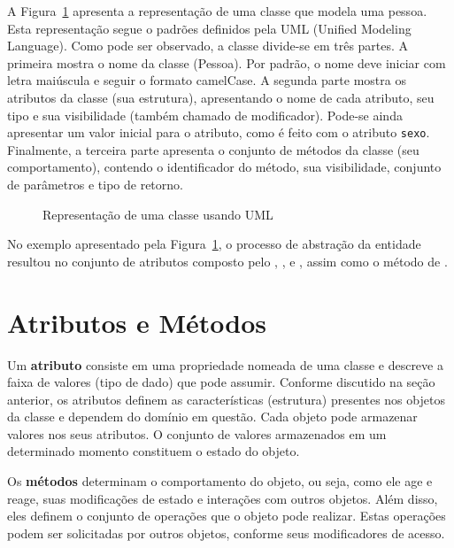 A Figura~\ref{fig:classe} apresenta a representação de uma classe que modela uma pessoa. Esta representação segue o padrões definidos pela UML (Unified Modeling Language). Como pode ser observado, a classe divide-se em três partes. A primeira mostra o nome da classe (Pessoa). Por padrão, o nome deve iniciar com letra maiúscula e seguir o formato camelCase. A segunda parte mostra os atributos da classe (sua estrutura), apresentando o nome de cada atributo, seu tipo e sua visibilidade (também chamado de modificador). Pode-se ainda apresentar um valor inicial para o atributo, como é feito com o atributo \texttt{sexo}. Finalmente, a terceira parte apresenta o conjunto de métodos da classe (seu comportamento), contendo o identificador do método, sua visibilidade, conjunto de parâmetros e tipo de retorno.

\begin{figure}[h]
	\centering
	\caption{Representação de uma classe usando UML}
	\label{fig:classe}
\end{figure}

No exemplo apresentado pela Figura~\ref{fig:classe}, o processo de abstração da entidade  resultou no conjunto de atributos composto pelo , ,  e , assim como o método de .

\section{Atributos e Métodos} 
Um \textbf{atributo} consiste em uma propriedade nomeada de uma classe e descreve a faixa de valores (tipo de dado) que pode assumir. Conforme discutido na seção anterior, os atributos definem as características (estrutura) presentes nos objetos da classe e dependem do domínio em questão. Cada objeto pode armazenar valores nos seus atributos. O conjunto de valores armazenados em um determinado momento constituem o estado do objeto.

Os \textbf{métodos} determinam o comportamento do objeto, ou seja, como ele age e reage, suas modificações de estado e interações com outros objetos. Além disso, eles definem o conjunto de operações que o objeto pode realizar. Estas operações podem ser solicitadas por outros objetos, conforme seus modificadores de acesso.

